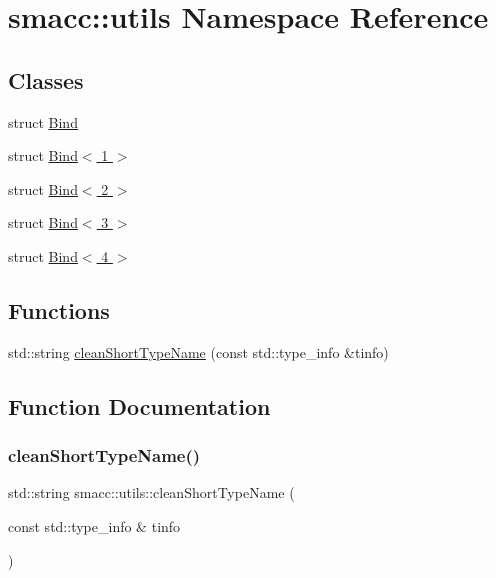 \hypertarget{namespacesmacc_1_1utils}{}\section{smacc\+:\+:utils Namespace Reference}
\label{namespacesmacc_1_1utils}
\subsection*{Classes}
\begin{DoxyCompactItemize}
\item 
struct \hyperlink{structsmacc_1_1utils_1_1Bind}{Bind}
\item 
struct \hyperlink{structsmacc_1_1utils_1_1Bind_3_011_01_4}{Bind$<$ 1 $>$}
\item 
struct \hyperlink{structsmacc_1_1utils_1_1Bind_3_012_01_4}{Bind$<$ 2 $>$}
\item 
struct \hyperlink{structsmacc_1_1utils_1_1Bind_3_013_01_4}{Bind$<$ 3 $>$}
\item 
struct \hyperlink{structsmacc_1_1utils_1_1Bind_3_014_01_4}{Bind$<$ 4 $>$}
\end{DoxyCompactItemize}
\subsection*{Functions}
\begin{DoxyCompactItemize}
\item 
std\+::string \hyperlink{namespacesmacc_1_1utils_aacd1975bb7cd9bec4b50e111a2ae7edb}{clean\+Short\+Type\+Name} (const std\+::type\+\_\+info \&tinfo)
\end{DoxyCompactItemize}


\subsection{Function Documentation}
\mbox{\label{namespacesmacc_1_1utils_aacd1975bb7cd9bec4b50e111a2ae7edb}} 
\subsubsection{\texorpdfstring{clean\+Short\+Type\+Name()}{cleanShortTypeName()}}
{\footnotesize\ttfamily std\+::string smacc\+::utils\+::clean\+Short\+Type\+Name (\begin{DoxyParamCaption}\item[{const std\+::type\+\_\+info \&}]{tinfo }\end{DoxyParamCaption})}



